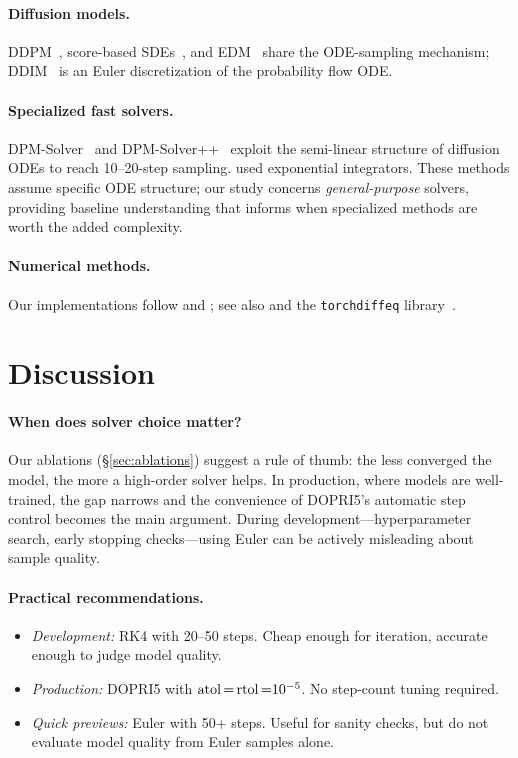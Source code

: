 \documentclass[11pt]{article}
\begin{document}
\paragraph{Diffusion models.}
DDPM~\citep{ho2020denoising}, score-based SDEs~\citep{song2021scorebased},
and EDM~\citep{karras2022elucidating} share the ODE-sampling
mechanism; DDIM~\citep{song2021denoising} is an Euler discretization
of the probability flow ODE.

\paragraph{Specialized fast solvers.}
DPM-Solver~\citep{lu2022dpmsolver} and
DPM-Solver++~\citep{lu2023dpmsolverplusplus} exploit the semi-linear
structure of diffusion ODEs to reach 10--20-step sampling.
\citet{zhang2023fast} used exponential integrators.
These methods assume specific ODE structure; our study concerns
\emph{general-purpose} solvers, providing baseline understanding
that informs when specialized methods are worth the added
complexity.

\paragraph{Numerical methods.}
Our implementations follow \citet{hairer1993solving} and
\citet{dormand1980family}; see also \citet{butcher2016numerical}
and the \texttt{torchdiffeq} library~\citep{kidger2021hey}.

\section{Discussion}
\label{sec:discussion}

\paragraph{When does solver choice matter?}
Our ablations (\S\ref{sec:ablations}) suggest a rule of thumb:
the less converged the model, the more a high-order solver helps.
In production, where models are well-trained, the gap narrows and
the convenience of DOPRI5's automatic step control becomes the
main argument.  During development---hyperparameter search, early
stopping checks---using Euler can be actively misleading about
sample quality.

\paragraph{Practical recommendations.}
\begin{itemize}[nosep]
\item \emph{Development:} RK4 with 20--50 steps.  Cheap enough
  for iteration, accurate enough to judge model quality.
\item \emph{Production:} DOPRI5 with $\operatorname{atol}{=}\operatorname{rtol}{=}10^{-5}$.
  No step-count tuning required.
\item \emph{Quick previews:} Euler with 50+ steps.  Useful for
  sanity checks, but do not evaluate model quality from Euler
  samples alone.
\end{itemize}
\end{document}
